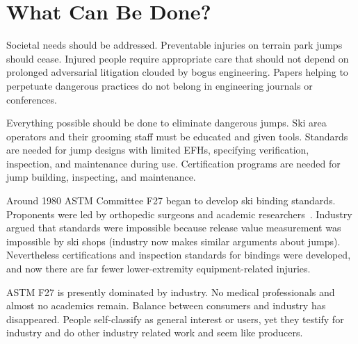 \documentclass[smallextended]{svjour3}       %
\begin{document}
\section{What Can Be Done?}
\label{sec:action}
%
Societal needs should be addressed. Preventable injuries on terrain park jumps
should cease. Injured people require appropriate care that should not depend on
prolonged adversarial litigation clouded by bogus engineering. Papers helping to
perpetuate dangerous practices do not belong in engineering journals or
conferences.

Everything possible should be done to eliminate dangerous jumps. Ski area
operators and their grooming staff must be educated and given tools. Standards
are needed for jump designs with limited EFHs, specifying verification,
inspection, and maintenance during use. Certification programs are needed for
jump building, inspecting, and maintenance.

Around 1980 ASTM Committee F27 began to develop ski binding standards. Proponents
were led by orthopedic surgeons and academic researchers~\cite{Bahniuk1996}.
Industry argued that standards were impossible because release value measurement 
was impossible by ski
shops (industry now makes similar arguments about jumps). Nevertheless
certifications and inspection standards for bindings were developed, and now
there are far fewer lower-extremity equipment-related injuries.

ASTM F27 is presently dominated by industry. No medical professionals and almost no
academics remain. Balance between consumers and industry has disappeared. People
self-classify as general interest or users, yet they testify for industry and
do other industry related work and seem like producers.

\end{document}
